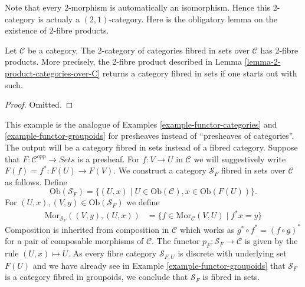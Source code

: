 \noindent
Note that every $2$-morphism is automatically an isomorphism.
Hence this $2$-category is actualy a $(2, 1)$-category.
Here is the obligatory lemma on the existence of $2$-fibre products.

\begin{lemma}
\label{lemma-2-product-categories-fibred-sets}
Let $\mathcal{C}$ be a category.
The 2-category of categories fibred in sets over $\mathcal{C}$
has 2-fibre products. More precisely, the 2-fibre product described in
Lemma \ref{lemma-2-product-categories-over-C}
returns a category fibred in sets if one starts out with such.
\end{lemma}

\begin{proof}
Omitted.
\end{proof}

\begin{example}
\label{example-presheaf}
This example is the analogue of
Examples \ref{example-functor-categories} and
\ref{example-functor-groupoids}
for presheaves instead of ``presheaves of categories''.
The output will be a category fibred in sets instead of a fibred category.
Suppose that $F : \mathcal{C}^{opp} \to \textit{Sets}$ is a presheaf.
For $f : V \to U$ in $\mathcal{C}$ we will
suggestively write $F(f) = f^\ast : F(U) \to F(V)$.
We construct a category $\mathcal{S}_F$ fibred in sets over $\mathcal{C}$
as follows. Define
$$
\text{Ob}(\mathcal{S}_F) =
\{(U, x) \mid U \in \text{Ob}(\mathcal{C}), x \in \text{Ob}(F(U))\}.
$$
For $(U, x), (V, y) \in \text{Ob}(\mathcal{S}_F)$ we define
\begin{align*}
\text{Mor}_{\mathcal{S}_F}((V, y), (U, x))
& =
\{f \in \text{Mor}_\mathcal{C}(V, U) \mid f^*x = y\}
\end{align*}
Composition is inherited from composition in $\mathcal{C}$
which works as $g^\ast \circ f^\ast = (f \circ g)^\ast$
for a pair of composable morphisms of $\mathcal{C}$.
The functor $p_F : \mathcal{S}_F \to \mathcal{C}$
is given by the rule $(U, x) \mapsto U$.
As every fibre category $\mathcal{S}_{F, U}$ is discrete with underlying
set $F(U)$ and we have already see in
Example \ref{example-functor-groupoids}
that $\mathcal{S}_F$ is a category fibred in groupoids,
we conclude that $\mathcal{S}_F$ is fibred in sets.
\end{example}

